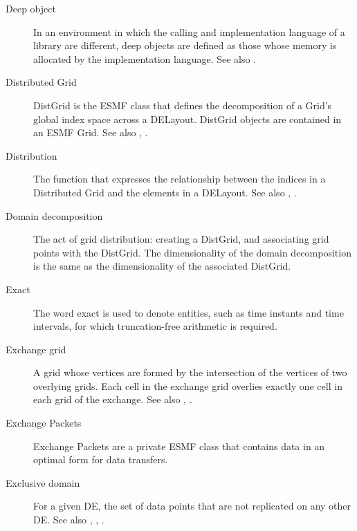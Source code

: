 \begin{description}
\label{glos:DeepObjects}
\item[Deep object] In an environment
  in which the calling and implementation language of a library are
  different, deep objects are defined as those whose memory is 
  allocated by the implementation language. 
  See also . 

\label{glos:DistGrid}
\item[Distributed Grid]
  DistGrid is the ESMF class that defines the 
  decomposition of a Grid's global index space across a DELayout.
  DistGrid objects are contained in an ESMF Grid. 
  See also , .

\label{glos:Distribution}
\item[Distribution] The function that expresses
  the relationship between the indices in a Distributed Grid and the elements 
  in a DELayout. See also , 
  . 

\label{glos:DomainDecomp}
\item[Domain decomposition] The act of grid 
  distribution: creating a DistGrid, and associating grid points with 
  the DistGrid.  The dimensionality of the domain decomposition is the 
  same as the dimensionality of the associated DistGrid.

\label{glos:Exact}
\item [Exact] The word exact is used
  to denote entities, such as time instants and time intervals, for 
  which truncation-free arithmetic is required. 

\label{glos:ExchangeGrid}
\item[Exchange grid] A grid whose vertices are
  formed by the intersection of the vertices of two overlying grids.  Each 
  cell in the exchange grid overlies exactly one cell in each grid of the 
  exchange. See also , .

\label{glos:EP}
\item[Exchange Packets] Exchange Packets are a private
  ESMF class that contains data in an optimal form for data transfers.

\label{glos:ExcDomain}
\item[Exclusive domain] For a given DE, the 
  set of data points that are not replicated on any other DE.  See also 
  ,
  , .


\end{description}
